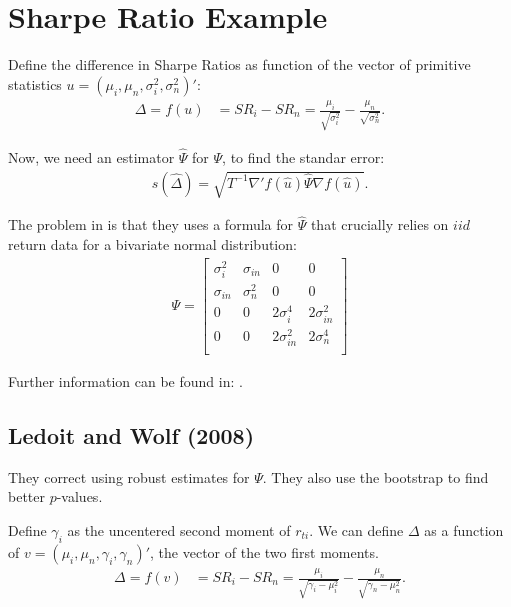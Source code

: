 \documentclass[12pt,oneside,a4paper]{article}
\begin{document}
\clearpage
\section{Sharpe Ratio Example}
\cite{lw2008}

Define the difference in Sharpe Ratios as function of the vector of primitive statistics $u = (\mu_{i}, \mu_{n}, \sigma^2_{i}, \sigma^2_{n})'$:
\begin{align}
\Delta = f(u) &= SR_{i} - SR_{n} 
= \frac{\mu_{i}}{\sqrt{\sigma^2_{i}}} - \frac{\mu_{n}}{\sqrt{\sigma^2_{n}}}.
\end{align}

Now, we need an estimator $\hat{\Psi}$ for $\Psi$, to find the standar error:
\begin{align}
s(\hat{\Delta}) = \sqrt{T^{-1} \nabla'f(\hat{u}) \hat{\Psi} \nabla f(\hat{u})}.
\end{align}

The problem in \cite{jk81} is that they uses a formula for $\hat{\Psi}$ that crucially relies on $iid$ return data for a bivariate normal distribution:
\begin{align*}
\Psi = 
\begin{bmatrix}
\sigma^2_{i} & \sigma_{in} & 0 & 0 \\
\sigma_{in} & \sigma^2_{n} & 0 & 0 \\
0 & 0 & 2\sigma^{4}_{i} & 2\sigma^{2}_{in}  \\
0 & 0 & 2\sigma^{2}_{in} & 2\sigma^{4}_{n}  \\
\end{bmatrix}
\end{align*}

Further information can be found in: \cite{lo02, jk81}.

\subsection{Ledoit and Wolf (2008)}

They correct \cite{jk81} using robust estimates for $\Psi$.
They also use the bootstrap to find better $p$-values.

Define $\gamma_{i}$ as the uncentered second moment of $r_{ti}$.
We can define $\Delta$ as a function of $v = (\mu_{i}, \mu_{n}, \gamma_{i}, \gamma_{n})'$, the vector of the two first moments.
\begin{align}
\Delta = f(v) &= SR_{i} - SR_{n} = 
\frac{\mu_{i}}{\sqrt{\gamma_{i} - \mu^2_{i}}} - \frac{\mu_{n}}{\sqrt{\gamma_{n} - \mu^2_{n}}}.
\end{align}
\end{document}
